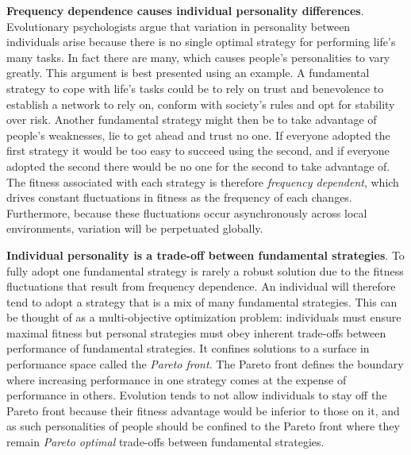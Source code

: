 \textbf{Frequency dependence causes individual personality differences}.
Evolutionary psychologists argue that variation in personality between individuals arise because there is no single optimal strategy for performing life's many tasks.
In fact there are many, which causes people's personalities to vary greatly.
This argument is best presented using an example.
A fundamental strategy to cope with life's tasks could be to rely on trust and benevolence to establish a network to rely on, conform with society's rules and opt for stability over risk. 
Another fundamental strategy might then be to take advantage of people's weaknesses, lie to get ahead and trust no one.
If everyone adopted the first strategy it would be too easy to succeed using the second, and if everyone adopted the second there would be no one for the second to take advantage of.
The fitness associated with each strategy is therefore \textit{frequency dependent}, which drives constant fluctuations in fitness as the frequency of each changes.
Furthermore, because these fluctuations occur asynchronously across local environments, variation will be perpetuated globally.

\textbf{Individual personality is a trade-off between fundamental strategies}.
To fully adopt one fundamental strategy is rarely a robust solution due to the fitness fluctuations that result from frequency dependence.
An individual will therefore tend to adopt a strategy that is a mix of many fundamental strategies.
This can be thought of as a multi-objective optimization problem: individuals must ensure maximal fitness but personal strategies must obey inherent trade-offs between performance of fundamental strategies.
It confines solutions to a surface in performance space called the \textit{Pareto front}.
The Pareto front defines the boundary where increasing performance in one strategy comes at the expense of performance in others.
Evolution tends to not allow individuals to stay off the Pareto front because their fitness advantage would be inferior to those on it, and as such personalities of people should be confined to the Pareto front where they remain \textit{Pareto optimal} trade-offs between fundamental strategies.

